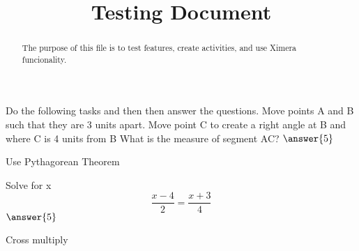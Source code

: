 \documentclass{ximera}
\title{Testing Document}
\begin{document}
\begin{abstract}
The purpose of this file is to test features, create activities, and use Ximera funcionality.
\end{abstract}
\maketitle
{}
\begin{problem}
Do the following tasks and then then answer the questions.
Move points A and B such that they are 3 units apart.
Move point C to create a right angle at B and where C is 4 units from B
What is the measure of segment AC?
$\answer{5}$
\begin{hint}
Use Pythagorean Theorem
\end{hint}
\begin{problem}
Solve for x
 \[\frac{x-4}{2}=\frac{x+3}{4}\]
$\answer{5}$
\begin{hint}
Cross multiply
\end{hint}
\end{problem}
\end{problem}
\end{document}

